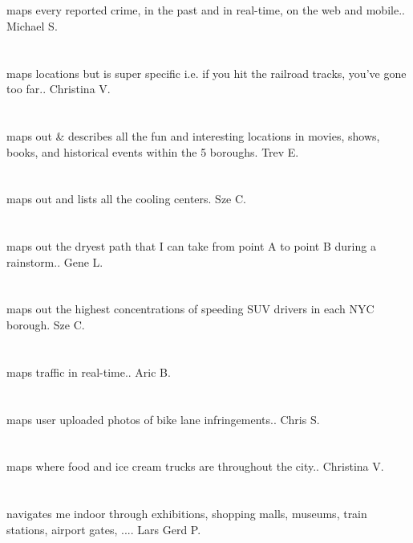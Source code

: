\section{}maps every reported crime,  in the past and in real-time,  on the web and mobile.. Michael S.
\section{}maps locations but is super specific i.e. if you hit the railroad tracks,  you've gone too far.. Christina  V.
\section{}maps out \& describes all the fun and interesting locations in movies,  shows,  books,  and historical events within the 5 boroughs. Trev E.
\section{}maps out and lists all the cooling centers. Sze C.
\section{}maps out the dryest path that I can take from point A to point B during a rainstorm.. Gene L.
\section{}maps out the highest concentrations of speeding SUV drivers in each NYC borough. Sze C.
\section{}maps traffic in real-time.. Aric B.
\section{}maps user uploaded photos of bike lane infringements.. Chris S.
\section{} maps where food and ice cream trucks are throughout the city.. Christina  V.
\section{}navigates me indoor through exhibitions,  shopping malls,  museums,  train stations,  airport gates,  .... Lars Gerd P.
